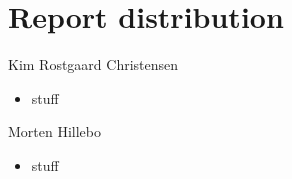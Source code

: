 \documentclass{acm_proc_article-sp}
\begin{document}
\section{Report distribution}
Kim Rostgaard Christensen
\begin{itemize}
\item stuff
\end{itemize}

Morten Hillebo
\begin{itemize}
\item stuff
\end{itemize}

\end{document}
